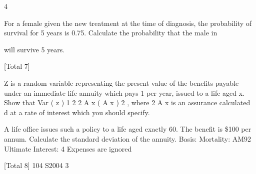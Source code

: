 \documentclass[a4paper,12pt]{article}
\begin{document}
4
\item  For a female given the new treatment at the time of diagnosis, the probability
of survival for 5 years is 0.75. Calculate the probability that the male in \item 
will survive 5 years.

[Total 7]
\item  Z is a random variable representing the present value of the benefits payable
under an immediate life annuity which pays 1 per year, issued to a life aged x.
Show that Var ( z )
1
2
2
A x
( A x ) 2 , where 2 A x is an assurance calculated
d
at a rate of interest which you should specify.
\item 

A life office issues such a policy to a life aged exactly 60. The benefit is \$100
per annum. Calculate the standard deviation of the annuity.
Basis: Mortality: AM92 Ultimate
Interest: 4%
Expenses are ignored

[Total 8]
104 S2004
3
\end{document}
